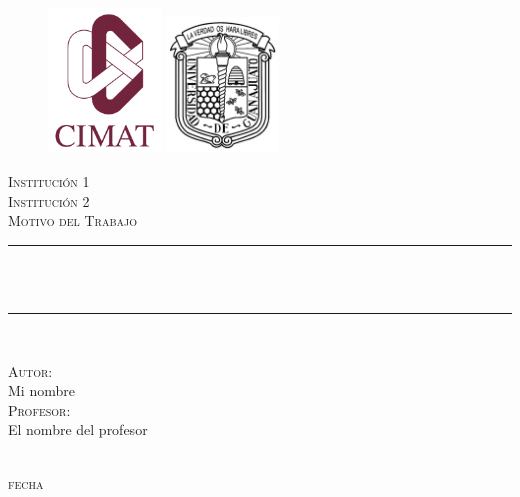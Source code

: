 \begin{titlepage}
	\centering
    \vspace*{0.0 cm}
    \begin{figure}[h!]\centering
        \begin{minipage}{0.4\textwidth}
            \includegraphics[width= 3cm]{img/logo_Cimat.png}            
        \end{minipage}\hfill
        \begin{minipage}{0.20\textwidth}
            \includegraphics[width= 3cm]{img/logoUG.png}
        \end{minipage}
    \end{figure}
    \textsc{\LARGE Institución 1}\\[0.3 cm]
    \textsc{\LARGE Institución 2}\\[2.0 cm]	%
	\textsc{\Large Motivo del Trabajo}\\[0.5 cm]
    {\color{coolred}
	\rule{\linewidth}{0.2 mm}} \\[0.4 cm]
	{ \huge \bfseries \color{mytitlecolor}{Título del Trabajo}}\\
    {\color{coolred}
	\rule{\linewidth}{0.2 mm}} \\[1.5 cm]
	
	\begin{minipage}{0.4\textwidth}
		\begin{center} \large
			\textsc{Autor:}\\[0.25 cm]
			Mi nombre\\ [1.0 cm]
			\textsc{Profesor:}\\[0.25 cm]
			El nombre del profesor
			\end{center}
	\end{minipage}\\[2 cm]
	{\normalsize \textsc{fecha}
    }\\[2 cm]
	\vfill
\end{titlepage}